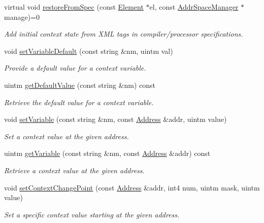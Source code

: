 \begin{DoxyCompactItemize}
virtual void \mbox{\hyperlink{class_context_database_ab21ed86cbe093ccf2f5a81a7db4a7174}{restore\+From\+Spec}} (const \mbox{\hyperlink{class_element}{Element}} $\ast$el, const \mbox{\hyperlink{class_addr_space_manager}{Addr\+Space\+Manager}} $\ast$manage)=0
\begin{DoxyCompactList}\small\item\em Add initial context state from X\+ML tags in compiler/processor specifications. \end{DoxyCompactList}\item 
void \mbox{\hyperlink{class_context_database_ad076227dbe22aad0f4a379e2f39ef488}{set\+Variable\+Default}} (const string \&nm, uintm val)
\begin{DoxyCompactList}\small\item\em Provide a default value for a context variable. \end{DoxyCompactList}\item 
uintm \mbox{\hyperlink{class_context_database_a8da40f85a0fa7a8af508f1df35c3de06}{get\+Default\+Value}} (const string \&nm) const
\begin{DoxyCompactList}\small\item\em Retrieve the default value for a context variable. \end{DoxyCompactList}\item 
void \mbox{\hyperlink{class_context_database_acda111acb02b6fdc598a7e872f002458}{set\+Variable}} (const string \&nm, const \mbox{\hyperlink{class_address}{Address}} \&addr, uintm value)
\begin{DoxyCompactList}\small\item\em Set a context value at the given address. \end{DoxyCompactList}\item 
uintm \mbox{\hyperlink{class_context_database_a70c042b2aed6df6e5194905a25758fcd}{get\+Variable}} (const string \&nm, const \mbox{\hyperlink{class_address}{Address}} \&addr) const
\begin{DoxyCompactList}\small\item\em Retrieve a context value at the given address. \end{DoxyCompactList}\item 
void \mbox{\hyperlink{class_context_database_a58728fefe21b68e5599cddfdb5b59091}{set\+Context\+Change\+Point}} (const \mbox{\hyperlink{class_address}{Address}} \&addr, int4 num, uintm mask, uintm value)
\begin{DoxyCompactList}\small\item\em Set a specific context value starting at the given address. \end{DoxyCompactList}\item 

\end{DoxyCompactItemize}
